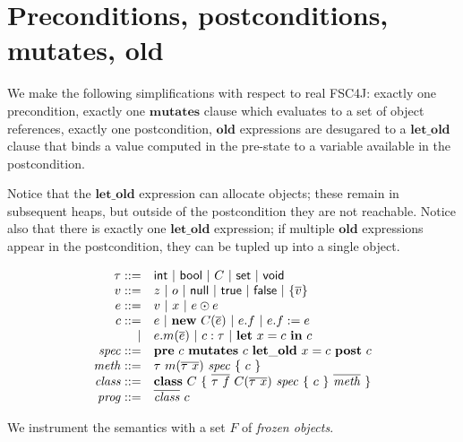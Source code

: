 \documentclass{article}
\newcommand{\op}{\odot}
\begin{document}
\section{Preconditions, postconditions, mutates, old}

We make the following simplifications with respect to real FSC4J: exactly one precondition, exactly one $\mathbf{mutates}$ clause which evaluates to a set of object references, exactly one postcondition, $\mathbf{old}$ expressions are desugared to a $\mathbf{let\_old}$ clause that binds a value computed in the pre-state to a variable available in the postcondition.

Notice that the $\mathbf{let\_old}$ expression can allocate objects; these remain in subsequent heaps, but outside of the postcondition they are not reachable. Notice also that there is exactly one $\mathbf{let\_old}$ expression; if multiple $\mathbf{old}$ expressions appear in the postcondition, they can be tupled up into a single object.

$$\begin{array}{r l}
\tau ::= & \mathsf{int}\ |\ \mathsf{bool}\ |\ C\ |\ \mathsf{set}\ |\ \mathsf{void}\\
v ::= & z\ |\ o\ |\ \mathsf{null}\ |\ \mathsf{true}\ |\ \mathsf{false}\ |\ \{\overline{v}\}\\
e ::= & v\ |\ x\ |\ e \op e\\
c ::= & e\ |\ \mathbf{new}\ C(\overline{e})\ |\ e.f\ |\ e.f := e\\
| & e.m(\overline{e})\ |\ c : \tau\ |\ \mathbf{let}\ x = c\ \mathbf{in}\ c\\
\mathit{spec} ::= & \mathbf{pre}\ c\ \mathbf{mutates}\ c\ \mathbf{let\_old}\ x = c\ \mathbf{post}\ c\\
\mathit{meth} ::= & \tau\ m(\overline{\tau\ x})\ \mathit{spec}\ \{\ c\ \}\\
\mathit{class} ::= & \mathbf{class}\ C\ \{\ \overline{\tau\ f}\ C(\overline{\tau\ x})\ \mathit{spec}\ \{\ c\ \}\ \overline{\mathit{meth}}\ \}\\
\mathit{prog} ::= & \overline{\mathit{class}}\ c
\end{array}$$

We instrument the semantics with a set $F$ of \emph{frozen objects}.
\end{document}
